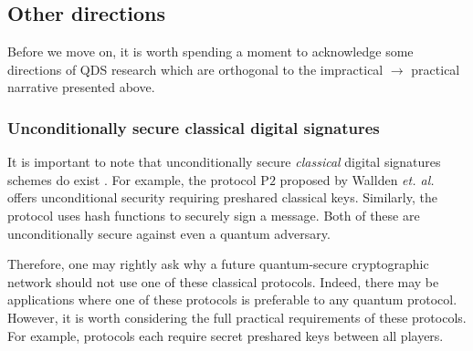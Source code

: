 \subsection{Other directions}


%
%

Before we move on, it is worth spending a moment to acknowledge some directions of QDS research which are orthogonal to the impractical $\rightarrow$ practical narrative presented above.


\subsubsection*{Unconditionally secure classical digital signatures}
It is important to note that unconditionally secure \emph{classical} digital signatures schemes do exist \cite{Wallden2015, Amiri2016a, Hanaoka2000}. For example, the protocol P$2$ proposed by Wallden \emph{et. al.} \cite{Wallden2015} offers unconditional security requiring preshared classical keys. Similarly, the protocol \cite{Amiri2016a} uses hash functions to securely sign a message. %
Both of these are unconditionally secure against even a quantum adversary.

Therefore, one may rightly ask why a future quantum-secure cryptographic network should not use one of these classical protocols. Indeed, there may be applications where one of these protocols is preferable to any quantum protocol. However, it is worth considering the full practical requirements of these protocols. For example, protocols \cite{Wallden2015, Amiri2016a} each require secret preshared keys between all players. 

